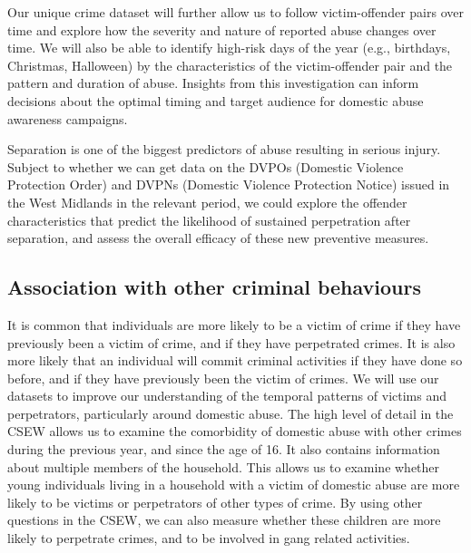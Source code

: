 \documentclass[12pt, letterpaper]{article}
\begin{document}
Our unique crime dataset will further allow us to follow victim-offender pairs over time and explore how the severity and nature of reported abuse changes over time. We will also be able to identify high-risk days of the year (e.g., birthdays, Christmas, Halloween) by the characteristics of the victim-offender pair and the pattern and duration of abuse. Insights from this investigation can inform decisions about the optimal timing and target audience for domestic abuse awareness campaigns. 

Separation is one of the biggest predictors of abuse resulting in serious injury. Subject to whether we can get data on the DVPOs (Domestic Violence Protection Order) and DVPNs (Domestic Violence Protection Notice) issued in the West Midlands in the relevant period, we could explore the offender characteristics that predict the likelihood of sustained perpetration after separation, and assess the overall efficacy of these new preventive measures.



\subsection{Association with other criminal behaviours}

It is common that individuals are more likely to be a victim of crime if they have previously been a victim of crime, and if they have perpetrated crimes. It is also more likely that an individual will commit criminal activities if they have done so before, and if they have previously been the victim of crimes. We will use our datasets to improve our understanding of the temporal patterns of victims and perpetrators, particularly around domestic abuse. The high level of detail in the CSEW allows us to examine the comorbidity of domestic abuse with other crimes during the previous year, and since the age of 16. It also contains information about  multiple members of the household. This allows us to examine whether young individuals living in a household with a victim of domestic abuse are more likely to be victims or perpetrators of other types of crime. By using other questions in the CSEW, we can also measure whether these children are more likely to perpetrate crimes, and to be involved in gang related activities.
\end{document}
